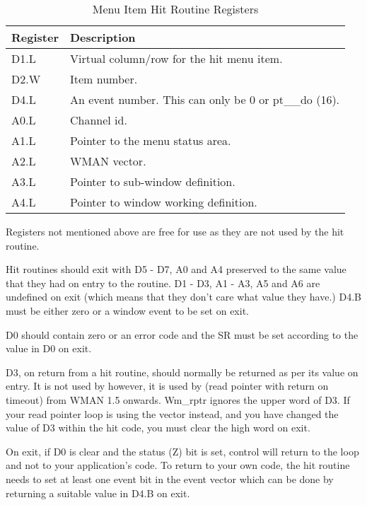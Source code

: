 \begin{table}[htbp]
\centering
\begin{tabular}{l p{}}
\toprule
\textbf{Register} &\textbf{Description}  \\
\midrule
%
D1.L & Virtual column/row for the hit menu item.\\
D2.W & Item number.\\
D4.L & An event number. This can only be 0 or pt\_\_do (16).\\
A0.L & Channel id.\\
A1.L & Pointer to the menu status area.\\
A2.L & WMAN vector.\\
A3.L & Pointer to sub-window definition.\\
A4.L & Pointer to window working definition.\\
%
\bottomrule
\end{tabular}
\caption{Menu Item Hit Routine Registers}
\label{tab:MenuItemHitRoutineRegisters}
\end{table}

Registers not mentioned above are free for use as they are not used
    by the hit routine.

Hit routines should exit with D5 -{} D7, A0 and A4 preserved to the
    same value that they had on entry to the routine. D1 -{} D3, A1 -{} A3, A5 and
    A6 are undefined on exit (which means that they don't care what value they
    have.) D4.B must be either zero or a window event to be set on
    exit.

D0 should contain zero or an error code and the SR must be set
    according to the value in D0 on exit.

\begin{note}
D3, on return from a hit routine, should normally be returned as
      per its value on entry. It is not used by  however, it is used by
       (read pointer with return on timeout) from
 WMAN 1.5 onwards. Wm\_rptr ignores the upper
      word of D3. If your read pointer loop is using the  vector
      instead, and you have changed the value of D3 within the hit code, you
      must clear the high word on exit.
\end{note}

On exit, if D0 is clear and the status (Z) bit is set, control will
    return to the  loop and not to your application's code. To return
    to your own code, the hit routine needs to set at least one event bit in
    the event vector which can be done by returning a suitable value in D4.B
    on exit.

